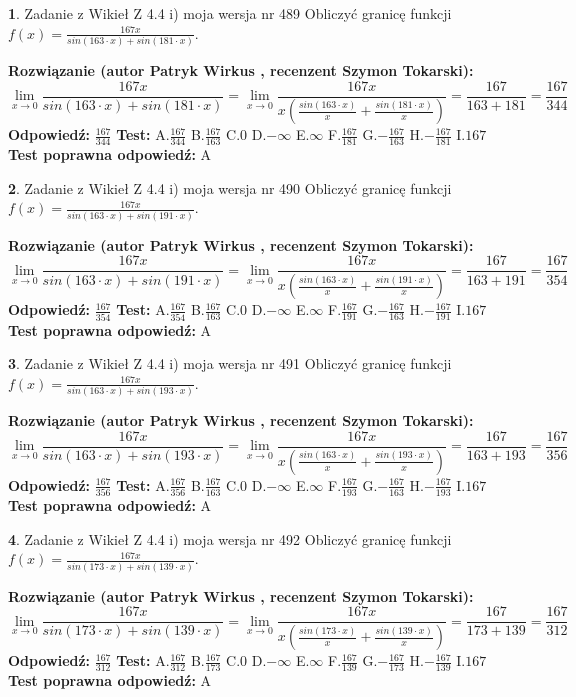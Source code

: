 \documentclass[12pt, a4paper]{article}
\theoremstyle{definition} %
\newtheorem{zad}{}
\newcommand{\zadStart}[1]{\begin{zad}#1\newline}
\newcommand{\zadStop}{\end{zad}}
\newcommand{\rozwStart}[2]{\noindent \textbf{Rozwiązanie (autor #1 , recenzent #2): }\newline}
\newcommand{\rozwStop}{\newline}
\newcommand{\odpStart}{\noindent \textbf{Odpowiedź:}\newline}
\newcommand{\odpStop}{\newline}
\newcommand{\testStart}{\noindent \textbf{Test:}\newline}
\newcommand{\testStop}{\newline}
\newcommand{\kluczStart}{\noindent \textbf{Test poprawna odpowiedź:}\newline}
\newcommand{\kluczStop}{\newline}
\begin{document}
\zadStart{Zadanie z Wikieł Z 4.4 i) moja wersja nr 489}
Obliczyć granicę funkcji $f(x)=\frac{167x}{sin(163\cdot x) +sin(181\cdot x)}$.
\zadStop
\rozwStart{Patryk Wirkus}{Szymon Tokarski}
$$\lim\limits_{x\to 0}\frac{167x}{sin(163\cdot x) +sin(181\cdot x)}=\lim\limits_{x\to 0}\frac{167x}{x(\frac{sin(163\cdot x)}{x}+\frac{sin(181\cdot x)}{x})}=\frac{167}{163+181} = \frac{167}{344}$$
\rozwStop
\odpStart
$\frac{167}{344}$
\odpStop
\testStart
A.$\frac{167}{344}$
B.$\frac{167}{163}$
C.$0$
D.$-\infty$
E.$\infty$
F.$\frac{167}{181}$
G.$-\frac{167}{163}$
H.$-\frac{167}{181}$
I.$167$
\testStop
\kluczStart
A
\kluczStop



\zadStart{Zadanie z Wikieł Z 4.4 i) moja wersja nr 490}
Obliczyć granicę funkcji $f(x)=\frac{167x}{sin(163\cdot x) +sin(191\cdot x)}$.
\zadStop
\rozwStart{Patryk Wirkus}{Szymon Tokarski}
$$\lim\limits_{x\to 0}\frac{167x}{sin(163\cdot x) +sin(191\cdot x)}=\lim\limits_{x\to 0}\frac{167x}{x(\frac{sin(163\cdot x)}{x}+\frac{sin(191\cdot x)}{x})}=\frac{167}{163+191} = \frac{167}{354}$$
\rozwStop
\odpStart
$\frac{167}{354}$
\odpStop
\testStart
A.$\frac{167}{354}$
B.$\frac{167}{163}$
C.$0$
D.$-\infty$
E.$\infty$
F.$\frac{167}{191}$
G.$-\frac{167}{163}$
H.$-\frac{167}{191}$
I.$167$
\testStop
\kluczStart
A
\kluczStop



\zadStart{Zadanie z Wikieł Z 4.4 i) moja wersja nr 491}
Obliczyć granicę funkcji $f(x)=\frac{167x}{sin(163\cdot x) +sin(193\cdot x)}$.
\zadStop
\rozwStart{Patryk Wirkus}{Szymon Tokarski}
$$\lim\limits_{x\to 0}\frac{167x}{sin(163\cdot x) +sin(193\cdot x)}=\lim\limits_{x\to 0}\frac{167x}{x(\frac{sin(163\cdot x)}{x}+\frac{sin(193\cdot x)}{x})}=\frac{167}{163+193} = \frac{167}{356}$$
\rozwStop
\odpStart
$\frac{167}{356}$
\odpStop
\testStart
A.$\frac{167}{356}$
B.$\frac{167}{163}$
C.$0$
D.$-\infty$
E.$\infty$
F.$\frac{167}{193}$
G.$-\frac{167}{163}$
H.$-\frac{167}{193}$
I.$167$
\testStop
\kluczStart
A
\kluczStop



\zadStart{Zadanie z Wikieł Z 4.4 i) moja wersja nr 492}
Obliczyć granicę funkcji $f(x)=\frac{167x}{sin(173\cdot x) +sin(139\cdot x)}$.
\zadStop
\rozwStart{Patryk Wirkus}{Szymon Tokarski}
$$\lim\limits_{x\to 0}\frac{167x}{sin(173\cdot x) +sin(139\cdot x)}=\lim\limits_{x\to 0}\frac{167x}{x(\frac{sin(173\cdot x)}{x}+\frac{sin(139\cdot x)}{x})}=\frac{167}{173+139} = \frac{167}{312}$$
\rozwStop
\odpStart
$\frac{167}{312}$
\odpStop
\testStart
A.$\frac{167}{312}$
B.$\frac{167}{173}$
C.$0$
D.$-\infty$
E.$\infty$
F.$\frac{167}{139}$
G.$-\frac{167}{173}$
H.$-\frac{167}{139}$
I.$167$
\testStop
\kluczStart
A
\kluczStop
\end{document}
